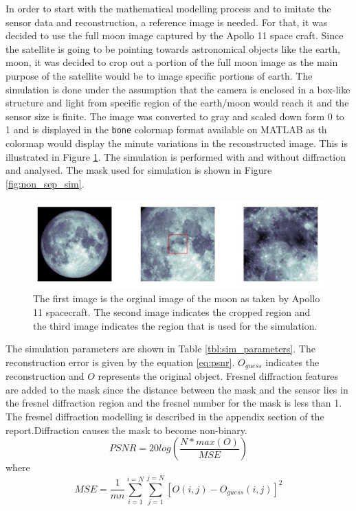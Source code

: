 In order to start with the mathematical modelling process and to imitate the sensor data and reconstruction, a reference image is needed. For that, it was decided to use the full moon image captured by the Apollo 11 space craft\cite{MoonImage}. Since the satellite is going to be pointing towards astronomical objects like the earth, moon, it was decided to crop out a portion of the full moon image as the main purpose of the satellite would be to image specific portions of earth. The simulation is done under the assumption that the camera is enclosed in a box-like structure and light from specific region of the earth/moon would reach it and the sensor size is finite. The image was converted to gray and scaled down form 0 to 1 and is displayed in the \texttt{bone} colormap format available on MATLAB as th colormap would display the minute variations in the reconstructed image. This is illustrated in Figure \ref{fig:moon_image}. The simulation is performed with and without diffraction and analysed. The mask used for simulation is shown in Figure \ref{fig:non_sep_sim}.
\begin{figure}[ht]
\includegraphics[scale = 0.50]{pics/MoonImagePortion}
\caption{The first image is the orginal image of the moon as taken by Apollo 11 spacecraft. The second image indicates the cropped region and the third image indicates the region that is used for the simulation.}
\label{fig:moon_image}
\end{figure}
The simulation parameters are shown in Table \ref{tbl:sim_parameters}. The reconstruction error is given by the equation \ref{eq:psnr}. $O_{guess}$ indicates the reconstruction and $O$ represents the original object. Fresnel diffraction features are added to the mask since the distance between the mask and the sensor lies in the fresnel diffraction region and the fresnel number for the mask is less than  1. The fresnel diffraction modelling is described in the appendix section of the report.Diffraction causes the mask to become non-binary.
\begin{equation}
PSNR = 20log(\frac{N*max(O)}{MSE})
\label{eq:psnr}
\end{equation}
where 
\begin{equation}
MSE = \frac{1}{mn}\sum_{i=1}^{i=N}\sum_{j=1}^{j=N}[O(i,j) - O_{guess}(i,j)]^2
\end{equation}

